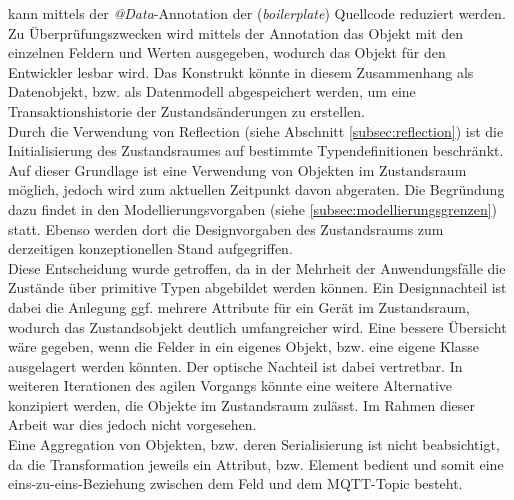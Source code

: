     kann mittels der \textit{@Data}-Annotation der (\textit{boilerplate}) Quellcode reduziert werden. Zu Überprüfungszwecken wird mittels der Annotation das Objekt mit den einzelnen 
    Feldern und Werten ausgegeben, wodurch das Objekt für den Entwickler lesbar wird. Das Konstrukt könnte in diesem Zusammenhang als Datenobjekt, bzw. als Datenmodell abgespeichert werden, um eine 
    Transaktionshistorie der Zustandsänderungen zu erstellen.
    \\
    \linebreak
    Durch die Verwendung von Reflection (siehe Abschnitt \ref{subsec:reflection}) ist die Initialisierung des Zustandsraumes auf bestimmte Typendefinitionen beschränkt. 
    Auf dieser Grundlage ist eine Verwendung von Objekten im Zustandsraum möglich, jedoch wird zum aktuellen Zeitpunkt davon abgeraten. Die 
    Begründung dazu findet in den Modellierungsvorgaben (siehe \ref{subsec:modellierungsgrenzen}) statt. Ebenso werden dort die Designvorgaben des 
    Zustandsraums zum derzeitigen konzeptionellen Stand aufgegriffen. 
    \\ 
    Diese Entscheidung wurde getroffen, da in der Mehrheit der Anwendungsfälle die Zustände über primitive Typen abgebildet werden können. 
    Ein Designnachteil ist dabei die Anlegung ggf. mehrere Attribute für ein Gerät im Zustandsraum, wodurch das Zustandsobjekt 
    deutlich umfangreicher wird. Eine bessere Übersicht wäre gegeben, wenn die Felder in ein eigenes Objekt, bzw. eine eigene Klasse ausgelagert werden könnten. 
    Der optische Nachteil ist dabei vertretbar. In weiteren Iterationen des agilen Vorgangs könnte eine weitere Alternative konzipiert werden, die Objekte 
    im Zustandsraum zulässt. Im Rahmen dieser Arbeit war dies jedoch nicht vorgesehen.
    \\
    Eine Aggregation von Objekten, bzw. deren Serialisierung ist nicht beabsichtigt, da die Transformation jeweils ein Attribut, bzw. Element bedient und somit eine 
    eins-zu-eins-Beziehung zwischen dem Feld und dem \acs{MQTT}-Topic besteht. 

